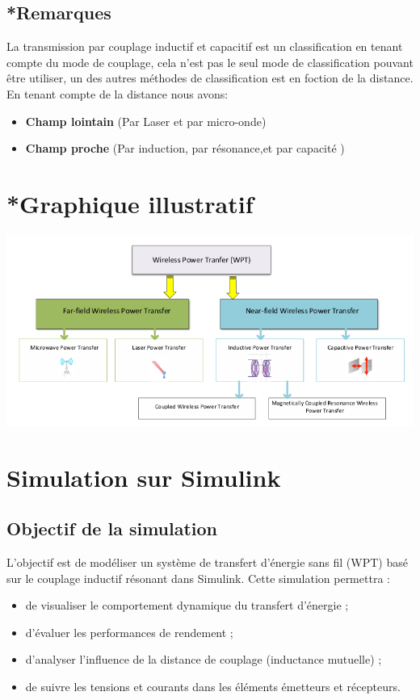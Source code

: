 \documentclass[12pt,a4paper,titlepage,notitlepage]{article}
\begin{document}
	
	\subsection*{*Remarques}
	La transmission par couplage inductif et capacitif est un classification en tenant compte du mode de couplage, cela n'est pas le seul mode de  classification pouvant être utiliser, un des autres méthodes de classification est en foction de la distance. En tenant compte de la distance nous avons:
	\begin{itemize}
		\item \textbf{Champ lointain} (Par Laser et par micro-onde)
		\item \textbf{Champ proche} (Par induction, par résonance,et par capacité )
	\end{itemize}

	\section*{*Graphique illustratif}
	\includegraphics[width=1.1\textwidth]{classification_WPT}
	
	
	
	
	
	\section{Simulation sur Simulink}
	\subsection{Objectif de la simulation}
	
	L’objectif est de modéliser un système de transfert d’énergie sans fil (WPT) basé sur le couplage inductif résonant dans Simulink. Cette simulation permettra :
	
	\begin{itemize}
		\item de visualiser le comportement dynamique du transfert d’énergie ;
		\item d’évaluer les performances de rendement ;
		\item d’analyser l’influence de la distance de couplage (inductance mutuelle) ;
		\item de suivre les tensions et courants dans les éléments émetteurs et récepteurs.
	\end{itemize}
	
\end{document}
